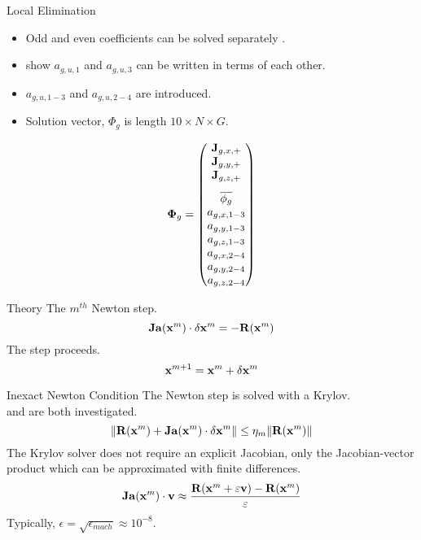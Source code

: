\begin{frame}{Local Elimination}
  \begin{itemize}
    \item Odd and even coefficients can be solved separately \cite{gehinThesis}.
    \item \citeauthor{qe2paper} show $a_{g,u,1}$ and $a_{g,u,3}$ can be written
      in terms of each other.
    \item $a_{g,u,1-3}$ and $a_{g,u,2-4}$ are introduced.
    \item Solution vector, $\Phi_g$ is length $10 \times N \times G$.
  \end{itemize}
  \begin{equation}
    \label{eq:solution_vector}
    \vPhi_g =
    \begin{pmatrix}
      \current_{g,x,+} \\
      \current_{g,y,+} \\
      \vspace{8pt}
      \current_{g,z,+} \\
      \overline{\phi_g} \\
      a_{g,x,1-3} \\
      a_{g,y,1-3} \\
      a_{g,z,1-3} \\
      a_{g,x,2-4} \\
      a_{g,y,2-4} \\
      a_{g,z,2-4}
    \end{pmatrix}
  \end{equation}
\end{frame}

\begin{frame}{ Theory}
  The $m^{th}$ Newton step.
  \begin{equation}
    \label{eq:newton_step}
    \mathbf{Ja} (\mathbf{x}^m) \cdot \delta\mathbf{x}^m = - \mathbf{R}(\mathbf{x}^m)
  \end{equation}
  The step proceeds.
  \begin{equation}
    \mathbf{x}^{m+1} = \mathbf{x}^{m} + \delta\mathbf{x}^{m}
  \end{equation}
\end{frame}

\begin{frame}{Inexact Newton Condition}
  The Newton step is solved with a Krylov. \\
   and  are both investigated.
  \begin{equation}
    \label{eq:inexact_newton_condition}
    \| \mathbf{R}(\mathbf{x}^m) + \mathbf{Ja}(\mathbf{x}^m) \cdot \delta\mathbf{x}^m \| \le 
      \eta_m \| \mathbf{R}(\mathbf{x}^m) \|
  \end{equation}
  The Krylov solver does not require an explicit Jacobian, only the
  Jacobian-vector product which can be approximated with finite differences.
  \begin{equation}
    \label{eq:dirder}
    \mathbf{Ja}(\mathbf{x}^m) \cdot \mathbf{v} \approx \frac{\mathbf{R}(\mathbf{x}^m + \varepsilon \mathbf{v}) - 
      \mathbf{R}(\mathbf{x}^m)}{\varepsilon}
  \end{equation}
  Typically, $\epsilon = \sqrt{\epsilon_{mach}} \approx 10^{-8}$.
\end{frame}

